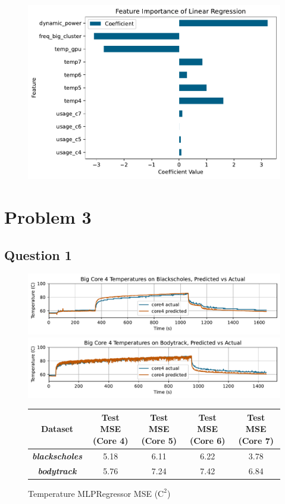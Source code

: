 \documentclass{article}
\begin{document}
\begin{figure} [!htb]
    \centering
    \includegraphics[scale=0.8]{linreg_importance.pdf}
    \label{fig:linreg-importance}
\end{figure}

\section{Problem 3}

\subsection{Question 1}

\begin{figure} [!htb]
    \centering
    \includegraphics[scale=0.8]{blk_mlp.pdf}
    \includegraphics[scale=0.8]{body_mlp.pdf}
    \label{fig:blk-body-mlp}
\end{figure}

\begin{figure} [!htb]
    \centering
    \caption{Temperature MLPRegressor MSE ($\text{C}^2$)}
    \begin{tabular}[!htb]{|c|c|c|c|c|} \hline
        Dataset & Test MSE (Core 4) & Test MSE (Core 5) & Test MSE (Core 6) & Test MSE (Core 7) \\ \hline
        \textit{\textbf{blackscholes}} & 5.18 & 6.11 & 6.22 & 3.78 \\ \hline
        \textit{\textbf{bodytrack}} & 5.76 & 7.24 & 7.42 & 6.84 \\ \hline
    \end{tabular}
    \label{fig:temp-mlp}
\end{figure}
\end{document}
